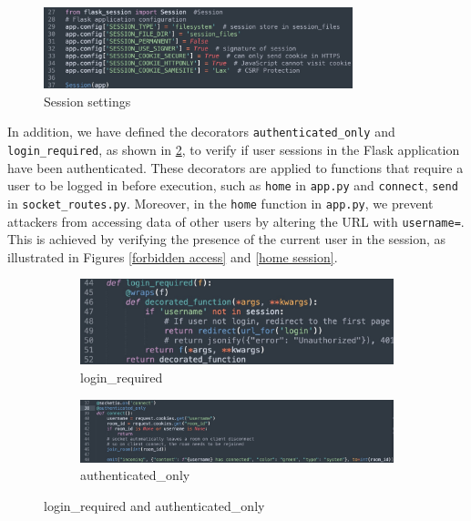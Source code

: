 \documentclass[12pt]{article}
\begin{document}
        \begin{figure}[H]
            \centering
            \includegraphics[width=0.8\textwidth]{graphs/session_settings.jpg}
            \caption{Session settings}
            \label{Session setting}
        \end{figure}

        In addition, we have defined the decorators \texttt{authenticated\_only} and \texttt{login\_required}, as shown in \ref{wrappers}, to verify if user sessions in the Flask application have been authenticated. These decorators are applied to functions that require a user to be logged in before execution, such as \texttt{home} in \texttt{app.py} and \texttt{connect}, \texttt{send} in \texttt{socket\_routes.py}. Moreover, in the \texttt{home} function in \texttt{app.py}, we prevent attackers from accessing data of other users by altering the URL with \texttt{username=}. This is achieved by verifying the presence of the current user in the session, as illustrated in Figures \ref{forbidden access} and \ref{home session}.

        \begin{figure}[H]
            \centering
            \begin{subfigure}[b]{0.75\textwidth}
                \centering
                \includegraphics[width=\textwidth]{graphs/login_required.jpg}
                \caption{login\_required}
            \end{subfigure}
            \hfill 
            \begin{subfigure}[b]{0.75\textwidth}
                \centering
                \includegraphics[width=\textwidth]{graphs/authenticated_only.jpg}
                \caption{authenticated\_only}
            \end{subfigure}
            \caption{login\_required and authenticated\_only}
            \label{wrappers}
        \end{figure}
\end{document}
